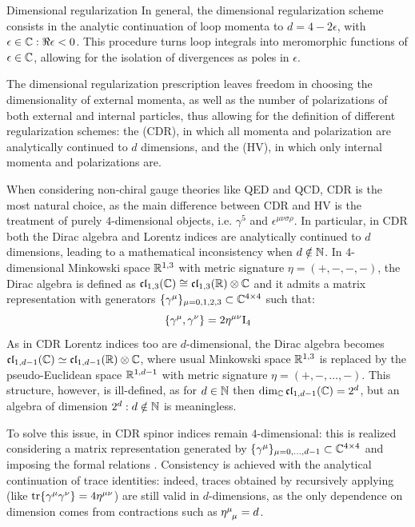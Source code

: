 \begin{observation}{Dimensional regularization}{}
  In general, the dimensional regularization scheme consists in the analytic continuation of loop momenta to $ d = 4 - 2 \epsilon $, with $ \epsilon \in \mathbb{C} : \Re \epsilon < 0 $. This procedure turns loop integrals into meromorphic functions of $ \epsilon \in \mathbb{C} $, allowing for the isolation of divergences as poles in $ \epsilon $.

  The dimensional regularization prescription leaves freedom in choosing the dimensionality of external momenta, as well as the number of polarizations of both external and internal particles, thus allowing for the definition of different regularization schemes: the  (CDR), in which all momenta and polarization are analytically continued to $ d $ dimensions, and the  (HV), in which only internal momenta and polarizations are.

  When considering non-chiral gauge theories like QED and QCD, CDR is the most natural choice, as the main difference between CDR and HV is the treatment of purely $ 4 $-dimensional objects, i.e. $ \gamma^5 $ and $ \epsilon^{\mu \nu \sigma \rho} $. In particular, in CDR both the Dirac algebra and Lorentz indices are analytically continued to $ d $ dimensions, leading to a mathematical inconsistency when $ d \notin \mathbb{N} $.
  In $ 4 $-dimensional Minkowski space $ \mathbb{R}^{1,3} $ with metric signature $ \eta = (+,-,-,-) $, the Dirac algebra is defined as $ \mathfrak{cl}_{1,3}(\mathbb{C}) \cong \mathfrak{cl}_{1,3}(\mathbb{R}) \otimes \mathbb{C} $ and it admits a matrix representation with generators $ \{\gamma^\mu\}_{\mu = 0, 1, 2, 3} \subset \mathbb{C}^{4 \times 4} $ such that:
  \begin{equation}
    \{\gamma^\mu , \gamma^\nu\} = 2 \eta^{\mu \nu} \mathrm{I}_4
    \label{eq:dir-alg}
  \end{equation}
  As in CDR Lorentz indices too are $ d $-dimensional, the Dirac algebra becomes $ \mathfrak{cl}_{1,d-1}(\mathbb{C}) \simeq \mathfrak{cl}_{1,d-1}(\mathbb{R}) \otimes \mathbb{C} $, where usual Minkowski space $ \mathbb{R}^{1,3} $ is replaced by the pseudo-Euclidean space $ \mathbb{R}^{1,d-1} $ with metric signature $ \eta = (+,-,\dots,-) $. This structure, however, is ill-defined, as for $ d \in \mathbb{N} $ then $ \dim_{\mathbb{C}} \mathfrak{cl}_{1,d-1}(\mathbb{C}) = 2^d $, but an algebra of dimension $ 2^d : d \notin \mathbb{N} $ is meaningless.

  To solve this issue, in CDR spinor indices remain $ 4 $-dimensional: this is realized considering a matrix representation generated by $ \{\gamma^\mu\}_{\mu = 0, \dots, d-1} \subset \mathbb{C}^{4 \times 4} $ and imposing the formal relations . Consistency is achieved with the analytical continuation of trace identities: indeed, traces obtained by recursively applying  (like $ \operatorname{tr}\{\gamma^\mu \gamma^\nu\} = 4 \eta^{\mu \nu} $) are still valid in $ d $-dimensions, as the only dependence on dimension comes from contractions such as $ \tensor{\eta}{^\mu_\mu} = d $.


\end{observation}

